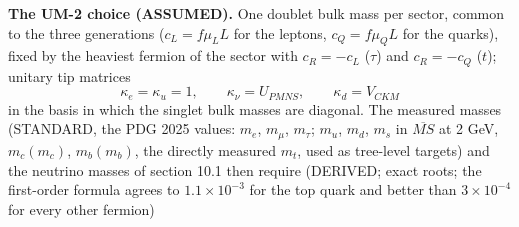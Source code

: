 \documentclass[
  10pt,
]{article}
\begin{document}
\textbf{The UM-2 choice (ASSUMED).} One doublet bulk mass per sector,
common to the three generations (\(c_L = f\mu_LL\) for the leptons,
\(c_Q = f\mu_QL\) for the quarks), fixed by the heaviest fermion of the
sector with \(c_R = -c_L\) (\(\tau\)) and \(c_R = -c_Q\) (\(t\));
unitary tip matrices
\[ \kappa_e = \kappa_u = 1,\qquad \kappa_\nu = U_{PMNS},\qquad \kappa_d = V_{CKM} \]
in the basis in which the singlet bulk masses are diagonal. The measured
masses (STANDARD, the PDG 2025 values: \(m_e\), \(m_\mu\), \(m_\tau\);
\(m_u\), \(m_d\), \(m_s\) in \(\overline{MS}\) at 2 GeV, \(m_c(m_c)\),
\(m_b(m_b)\), the directly measured \(m_t\), used as tree-level targets)
and the neutrino masses of section 10.1 then require (DERIVED; exact
roots; the first-order formula agrees to \(1.1\times10^{-3}\) for the
top quark and better than \(3\times10^{-4}\) for every other fermion)
\end{document}
